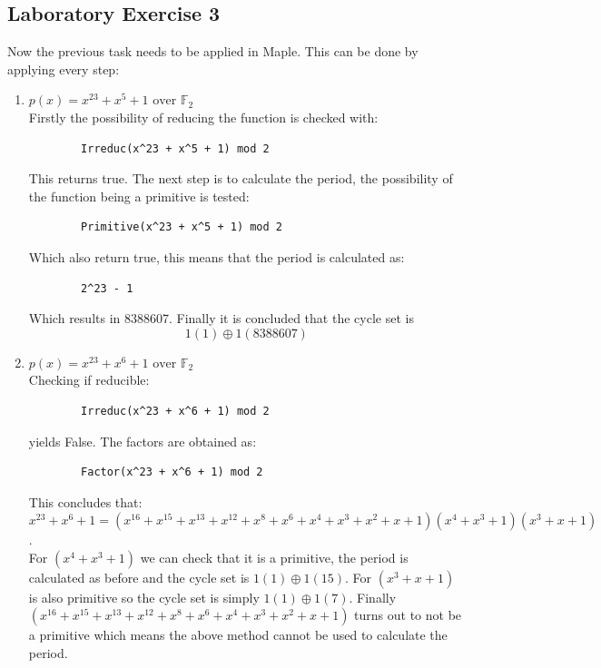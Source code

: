 \documentclass{article}
\begin{document}
\subsection{Laboratory Exercise 3}
Now the previous task needs to be applied in Maple. This can be done by applying every step: 
\begin{enumerate}
    \item $p(x) = x^{23} + x^5 + 1 \text{ over } \mathbb F_2$ \\
    Firstly the possibility of reducing the function is checked with:
    \begin{verbatim}
        Irreduc(x^23 + x^5 + 1) mod 2
    \end{verbatim}
    This returns true. The next step is to calculate the period, the possibility of the function being a primitive is tested:
    \begin{verbatim}
        Primitive(x^23 + x^5 + 1) mod 2
    \end{verbatim}
    Which also return true, this means that the period is calculated as:
    \begin{verbatim}
        2^23 - 1
    \end{verbatim}
    Which results in 8388607. Finally it is concluded that the cycle set is
    $$1(1) \oplus 1(8388607)$$
    
    \item $p(x) = x^{23} + x^6 + 1 \text{ over } \mathbb F_2$ \\
    Checking if reducible:
    \begin{verbatim}
        Irreduc(x^23 + x^6 + 1) mod 2
    \end{verbatim}
    yields False. The factors are obtained as:
    \begin{verbatim}
        Factor(x^23 + x^6 + 1) mod 2
    \end{verbatim}
    This concludes that: $x^{23} + x^6 + 1 = (x^{16} + x^{15} + x^{13} + x^{12} + x^8 + x^6 + x^4 + x^3 + x^2 + x + 1)(x^4 + x^3 + 1)(x^3 + x + 1)$. \\
    For $(x^4 + x^3 + 1)$ we can check that it is a primitive, the period is calculated as before and the cycle set is $1(1) \oplus 1(15)$. For $(x^3 + x + 1)$ is also primitive so the cycle set is simply $1(1) \oplus 1(7)$. 
    Finally $(x^{16} + x^{15} + x^{13} + x^{12} + x^8 + x^6 + x^4 + x^3 + x^2 + x + 1)$ turns out to not be a primitive which means the above method cannot be used to calculate the period. 
    
\end{enumerate}
\end{document}

